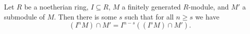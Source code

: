 Let $R$ be a noetherian ring, $I \subseteq R$, $M$ a finitely generated $R$-module,
and $M'$ a submodule of $M$. Then there is some $s$ such that for all
$n\geq s$ we have
\[ (I^nM)\cap M' = I^{n-s}((I^sM)\cap M'). \]
